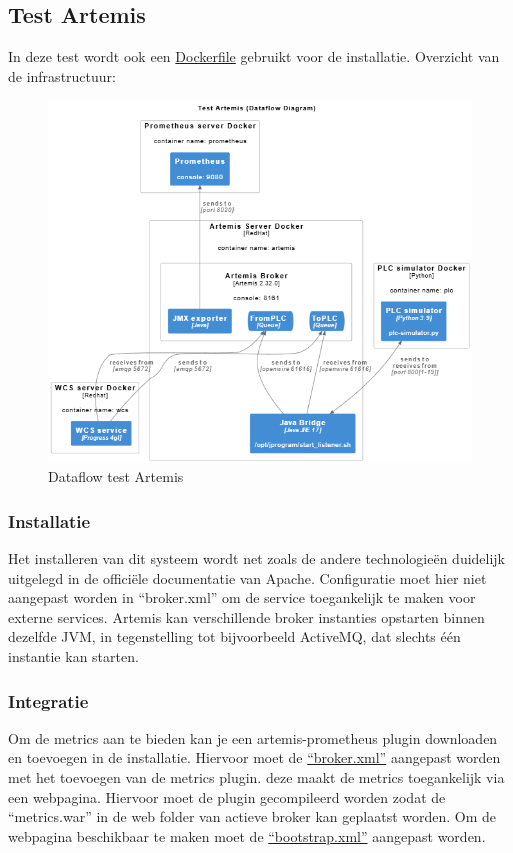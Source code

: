 \subsection{Test Artemis}
In deze test wordt ook een \hyperref[listing:docker_artemis]{Dockerfile} gebruikt voor de installatie.
Overzicht van de infrastructuur:
\begin{figure}[h!]
  \centering
  \includegraphics[width=.95\textwidth]{img/test-artemis-dataflow.png}
  \caption{\label{fig:test_artemis_dataflow}Dataflow test Artemis}
\end{figure}

\subsubsection{Installatie}
Het installeren van dit systeem wordt net zoals de andere technologieën duidelijk uitgelegd in de officiële documentatie van Apache.
Configuratie moet hier niet aangepast worden in ``broker.xml'' om de service toegankelijk te maken voor externe services.
Artemis kan verschillende broker instanties opstarten binnen dezelfde JVM, in tegenstelling tot bijvoorbeeld ActiveMQ, dat slechts één instantie kan starten.

\subsubsection{Integratie}
Om de metrics aan te bieden kan je een artemis-prometheus plugin downloaden en toevoegen in de installatie.
Hiervoor moet de \hyperref[listing:broker_artemis]{``broker.xml''} aangepast worden met het toevoegen van de metrics plugin.
deze maakt de metrics toegankelijk via een webpagina.
Hiervoor moet de plugin gecompileerd worden zodat de ``metrics.war'' in de web folder van actieve broker kan geplaatst worden.
Om de webpagina beschikbaar te maken moet de \hyperref[listing:bootstrap_artemis]{``bootstrap.xml''} aangepast worden.

